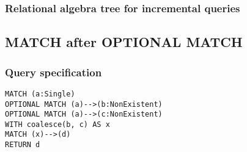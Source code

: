 
\subsubsection*{Relational algebra tree for incremental queries}


\subsection{MATCH after OPTIONAL MATCH}

\subsubsection*{Query specification}

\begin{lstlisting}
MATCH (a:Single)
OPTIONAL MATCH (a)-->(b:NonExistent)
OPTIONAL MATCH (a)-->(c:NonExistent)
WITH coalesce(b, c) AS x
MATCH (x)-->(d)
RETURN d
\end{lstlisting}

